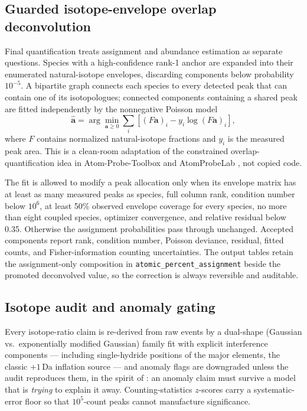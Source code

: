 \documentclass[11pt]{article}
\begin{document}
\subsection{Guarded isotope-envelope overlap deconvolution}
Final quantification treats assignment and abundance estimation as separate
questions. Species with a high-confidence rank-1 anchor are expanded into
their enumerated natural-isotope envelopes, discarding components below
probability $10^{-5}$. A bipartite graph connects each
species to every detected peak that can contain one of its isotopologues;
connected components containing a shared peak are fitted independently by
the nonnegative Poisson model
\begin{equation}
\hat{\boldsymbol a}=\arg\min_{\boldsymbol a\geq0}
\sum_i\left[(F\boldsymbol a)_i-y_i\log(F\boldsymbol a)_i\right],
\end{equation}
where $F$ contains normalized natural-isotope fractions and $y_i$ is the
measured peak area. This is a clean-room adaptation of the constrained
overlap-quantification idea in Atom-Probe-Toolbox and AtomProbeLab
\citep{felfer_toolbox,london2019}, not copied code.

The fit is allowed to modify a peak allocation only when its envelope matrix
has at least as many measured peaks as species, full column rank, condition
number below $10^6$, at least 50\% observed envelope coverage for every
species, no more than eight coupled species, optimizer convergence, and
relative residual below 0.35. Otherwise the assignment probabilities pass
through unchanged. Accepted components report rank, condition number,
Poisson deviance, residual, fitted counts, and Fisher-information counting
uncertainties. The output tables retain the assignment-only composition in
\texttt{atomic\_percent\_assignment} beside the promoted deconvolved value,
so the correction is always reversible and auditable.

\subsection{Isotope audit and anomaly gating}
Every isotope-ratio claim is re-derived from raw events by a dual-shape
(Gaussian vs.\ exponentially modified Gaussian) family fit with explicit
interference components --- including single-hydride positions of the
major elements, the classic $+1$\,Da inflation source --- and anomaly
flags are downgraded unless the audit reproduces them, in the spirit of
\citet{london2019}: an anomaly claim must survive a model that is
\emph{trying} to explain it away. Counting-statistics $z$-scores carry a
systematic-error floor so that $10^5$-count peaks cannot manufacture
significance.
\end{document}
